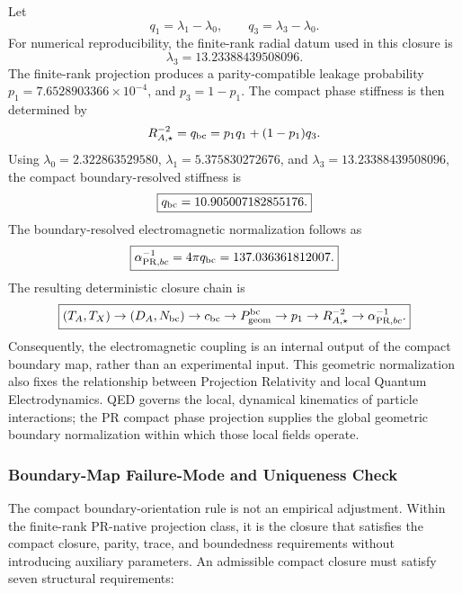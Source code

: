 \documentclass[11pt]{article}
\begin{document}
Let
\begin{equation}
q_1=\lambda_1-\lambda_0,
\qquad
q_3=\lambda_3-\lambda_0.
\end{equation}
For numerical reproducibility, the finite-rank radial datum used in this
closure is
\begin{equation}
\lambda_3
=
13.23388439508096.
\end{equation}
The finite-rank projection produces a parity-compatible leakage probability $p_1 = 7.6528903366\times10^{-4}$, and
$p_3=1-p_1$. The compact phase stiffness is then determined by
\begin{equation}
R_{A,\star}^{-2}
=
q_{\rm bc}
=
p_1q_1+(1-p_1)q_3.
\end{equation}
Using $\lambda_0=2.322863529580$, $\lambda_1=5.375830272676$, and $\lambda_3=13.23388439508096$, the compact boundary-resolved stiffness is
\begin{equation}
\boxed{
q_{\rm bc}
=
10.905007182855176.
}
\end{equation}
The boundary-resolved electromagnetic normalization follows as
\begin{equation}
\boxed{
\alpha_{{\rm PR},bc}^{-1}
=
4\pi q_{\rm bc}
=
137.036361812007.
}
\end{equation}
The resulting deterministic closure chain is
\begin{equation}
\boxed{
(T_A,T_X)
\rightarrow
(D_A,N_{\rm bc})
\rightarrow
c_{\rm bc}
\rightarrow
P_{\rm geom}^{\rm bc}
\rightarrow
p_1
\rightarrow
R_{A,\star}^{-2}
\rightarrow
\alpha_{{\rm PR},bc}^{-1}.
}
\end{equation}
Consequently, the electromagnetic coupling is an internal output of the compact
boundary map, rather than an experimental input. This geometric normalization
also fixes the relationship between Projection Relativity and local Quantum
Electrodynamics. QED governs the local, dynamical kinematics of particle
interactions; the PR compact phase projection supplies the global geometric
boundary normalization within which those local fields operate.

\subsubsection{Boundary-Map Failure-Mode and Uniqueness Check}
\label{sec:boundary_map_failure_mode_uniqueness}

The compact boundary-orientation rule is not an empirical adjustment. Within
the finite-rank PR-native projection class, it is the closure that satisfies the
compact closure, parity, trace, and boundedness requirements without introducing
auxiliary parameters. An admissible compact closure must satisfy seven
structural requirements:
\end{document}
